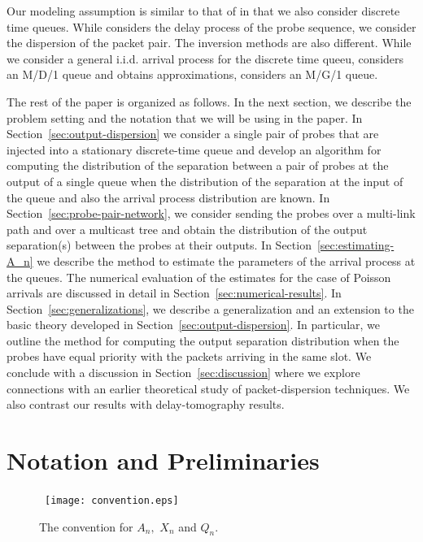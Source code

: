 \documentclass[11pt]{article}
\begin{document}
Our modeling assumption is similar to that of \cite{Machiraju07} in
that we also consider discrete time queues. While \cite{Machiraju07}
considers the delay process of the probe sequence, we consider the
dispersion of the packet pair. The inversion methods are also
different. While we consider a general i.i.d. arrival process for the
discrete time queeu, \cite{Park06} considers an M/D/1 queue and
obtains approximations, \cite{Haga06} considers an M/G/1 queue. 

The rest of the paper is organized as follows. In the next section, we
describe the problem setting and the notation that we will be using in
the paper. In Section~\ref{sec:output-dispersion} we consider a single
pair of probes that are injected into a stationary discrete-time queue
and develop an algorithm for computing the distribution of the
separation between a pair of probes at the output of a single queue
when the distribution of the separation at the input of the queue and
also the arrival process distribution are known. In
Section~\ref{sec:probe-pair-network}, we consider sending the probes
over a multi-link path and over a multicast tree and obtain the
distribution of the output separation(s) between the probes at their
outputs.  In Section~\ref{sec:estimating-A_n} we describe the method
to estimate the parameters of the arrival process at the queues. The
numerical evaluation of the estimates for the case of Poisson arrivals
are discussed in detail in Section~\ref{sec:numerical-results}. In
Section~\ref{sec:generalizations}, we describe a generalization and an
extension to the basic theory developed in
Section~\ref{sec:output-dispersion}. In particular, we outline the
method for computing the output separation distribution when the
probes have equal priority with the packets arriving in the same slot.
We conclude with a discussion in Section~\ref{sec:discussion} where we
explore connections with an earlier theoretical study of
packet-dispersion techniques. We also contrast our results with
delay-tomography results.

\section{Notation and Preliminaries}
\label{sec:notation}
\begin{figure}
  \begin{center}
    \     
    \texttt{[image: convention.eps]}
  \end{center}

  \caption{The convention for $A_n,$ $X_n$ and $Q_n.$}
    \label{fig:convention}
\end{figure}
\end{document}

